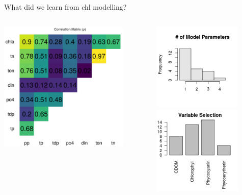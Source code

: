 \documentclass[compress,noflama,nosectionpages]{beamer}
\begin{document}
\begin{frame}{What did we learn from chl modelling?}
\vspace{1em}
	\begin{columns}
		\begin{column}{6cm}
			\includegraphics[width=6.2cm,keepaspectratio=true]{figures/chlcor_heatmap.png}
		\end{column}
		\begin{column}[c]{6cm}
					\includegraphics[width=4.2cm,keepaspectratio=true,clip=TRUE,trim= 0mm 5mm 0mm 7mm]{figures/modelparam_counts.png}\\
			\includegraphics[width=4.2cm,keepaspectratio=true,clip=TRUE,trim= 0mm 0mm 0mm 2mm]{figures/modelparam_hist.png}
		\end{column}
	\end{columns}
\end{frame}
\end{document}
